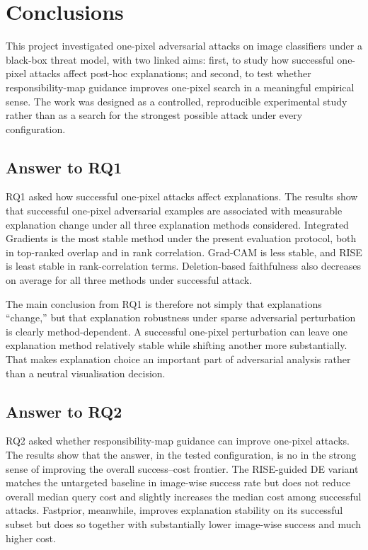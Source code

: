 \section{Conclusions}
\label{sec:conclusion}

This project investigated one-pixel adversarial attacks on image classifiers under a black-box threat model, with two linked aims:
first, to study how successful one-pixel attacks affect post-hoc explanations; and second, to test whether responsibility-map guidance improves one-pixel search in a meaningful empirical sense.
The work was designed as a controlled, reproducible experimental study rather than as a search for the strongest possible attack under every configuration.

\subsection{Answer to RQ1}
RQ1 asked how successful one-pixel attacks affect explanations.
The results show that successful one-pixel adversarial examples are associated with measurable explanation change under all three explanation methods considered.
Integrated Gradients is the most stable method under the present evaluation protocol, both in top-ranked overlap and in rank correlation.
Grad-CAM is less stable, and RISE is least stable in rank-correlation terms.
Deletion-based faithfulness also decreases on average for all three methods under successful attack.

The main conclusion from RQ1 is therefore not simply that explanations ``change,'' but that explanation robustness under sparse adversarial perturbation is clearly method-dependent.
A successful one-pixel perturbation can leave one explanation method relatively stable while shifting another more substantially.
That makes explanation choice an important part of adversarial analysis rather than a neutral visualisation decision.

\subsection{Answer to RQ2}
RQ2 asked whether responsibility-map guidance can improve one-pixel attacks.
The results show that the answer, in the tested configuration, is no in the strong sense of improving the overall success--cost frontier.
The RISE-guided DE variant matches the untargeted baseline in image-wise success rate but does not reduce overall median query cost and slightly increases the median cost among successful attacks.
Fastprior, meanwhile, improves explanation stability on its successful subset but does so together with substantially lower image-wise success and much higher cost.

